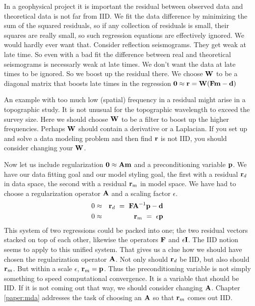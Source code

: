 \par
In a geophysical project
it is important the residual between observed data and theoretical data is not far from IID.
We fit the data difference by minimizing the sum of the squared residuals,
so if any collection of residuals is small,
their squares are really small,
so such regression equations are effectively ignored.
We would hardly ever want that.
Consider reflection seismograms.   They get weak at late time.
So even with a bad fit the difference between real and theoretical seismograms
is necessarly weak at late times.
We don't want the data at late times to be ignored.
So we boost up the residual there.
We choose $\bold W$ to be a diagonal matrix that boosts late times
in the regression $\bold 0 \approx \bold r = \bold W(\bold F\bold m-\bold d)$
\par
An example with too much low (spatial) frequency in a residual might arise in a topographic study.
It is not unusual for the topographic wavelength to exceed the survey size.
Here we should choose $\bold W$ to be a filter to boost up the higher frequencies.
Perhaps $\bold W$ should contain a derivative or a Laplacian.
If you set up and solve a data modeling problem
and then find $\bold r$ is not IID,
you should consider changing your $\bold W$.
\par
Now let us include regularization $\bold 0 \approx\bold A\bold m$
and a preconditioning variable $\bold p$.
We have our data fitting goal and our model styling goal,
the first with a residual $\bold r_d$
in data space, the second with a residual $\bold r_m$
in model space.
We have had to choose a regularization operator $\bold A$ and a scaling factor $\epsilon$.
\begin{eqnarray}
0 & \approx& \bold r_d  \ = \ \bold F \bold A^{-1}\bold p -\bold d 
\\
0 & \approx& \bold r_m  \ = \ \epsilon \bold p
\end{eqnarray}
This system of two regressions could be packed into one;
the two residual vectors stacked on top of each other,
likewise the operators $\bold F$ and $\epsilon \bold I$.
The IID notion seems to apply to this unified system.
That gives us a clue
how we should have chosen the regularization operator $\bold A$.
Not only should $\bold r_d$ be IID, but also should $\bold r_m$.
But within a scale $\epsilon$, $\bold r_m=\bold p$.
Thus the preconditioning variable is not simply something to speed computational convergence.
It is a variable that should be IID.
If it is not coming out that way, we should consider changing $\bold A$.
Chapter \ref{paper:mda} addresses the task of choosing an $\bold A$
so that $\bold r_m$ comes out IID.
\par
{}


